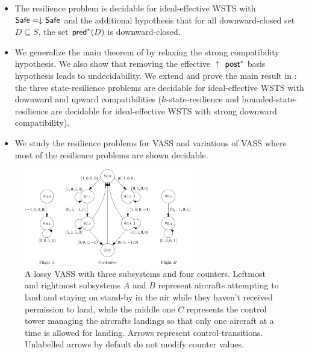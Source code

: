 \begin{itemize}
\item The resilience problem is decidable for ideal-effective WSTS with 
$\textsf{Safe}=\downarrow \textsf{Safe}$
and
the additional hypothesis that
for all downward-closed set $D \subseteq S$, the set $\textsf{pred}^*(D)$ is downward-closed.
%

\item We generalize the main theorem of \cite{DBLP:journals/corr/abs-2108-00889,DBLP:conf/gg/Ozkan22} by relaxing the strong compatibility hypothesis.
We also show that removing the effective 
$\uparrow$ $\textsf{post}^*$ basis hypothesis leads to undecidability. We extend and prove the main result in  \cite{DBLP:journals/corr/PrasadZ16} : the three state-resilience problems are decidable for ideal-effective WSTS with downward and upward compatibilities ({\sc $k$-state-resilience} and {\sc bounded-state-resilience} are decidable for ideal-effective WSTS with strong downward compatibility).
%

\item We study the resilience problems for VASS and variations of VASS where most of the resilience problems are shown decidable.
\end{itemize}


 
\begin{center}
	\begin{figure}
			\hspace{2cm}
\includegraphics[width=0.65\textwidth]{FigureB}
	\caption{A lossy VASS with three subsystems and four counters. Leftmost and rightmost subsystems $A$ and $B$ represent aircrafts attempting to land and staying on stand-by in the air while they haven't received permission to land, while the middle one $C$ represents the control tower managing the aircrafts landings so that only one aircraft at a time is allowed for landing. Arrows represent control-transitions. Unlabelled arrows by default do not modify counter values.}
					\label{air control}
	\end{figure}
\end{center}

